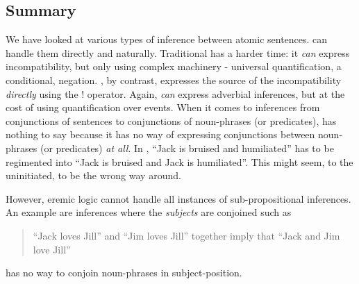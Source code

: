 \subsection{Summary}
We have looked at various types of inference between atomic
sentences. \ELFULL{} can handle them directly and naturally.  Traditional
\fol{} has a harder time: it
\emph{can} express incompatibility, but only using complex machinery -
universal quantification, a conditional, negation. \ELFULL{}, by
contrast, expresses the source of the incompatibility \emph{directly}
using the $!$ operator.  Again, \fol{} \emph{can} express
adverbial inferences, but at the cost of using quantification over
events.  When it comes to inferences from conjunctions of sentences to
conjunctions of noun-phrases (or predicates), \fol{} has
nothing to say because it has no way of expressing conjunctions
between noun-phrases (or predicates) \emph{at all}. In \fol{}, ``Jack is bruised and humiliated'' has to be regimented into
``Jack is bruised and Jack is humiliated''.  This might seem, to the uninitiated, to be the
wrong way around.  

However, eremic logic cannot handle all instances
of sub-propositional inferences.  An example are inferences where the
\emph{subjects} are conjoined such as
\begin{quote}
``Jack loves Jill'' and ``Jim loves Jill'' together imply that ``Jack and Jim love Jill''
\end{quote}

\NI \ELFULL{} has no way to conjoin noun-phrases in subject-position.
